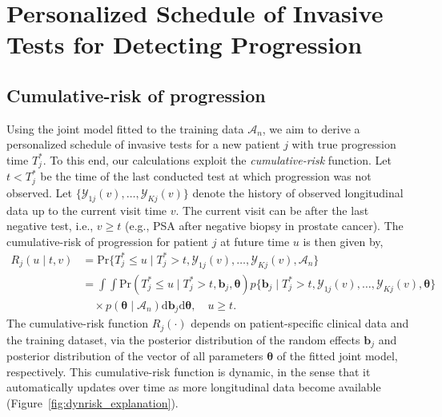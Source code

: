 \section{Personalized Schedule of Invasive Tests for Detecting Progression} 
\label{sec:schedule}

\subsection{Cumulative-risk of progression} 
\label{subsec:cum_risk}
Using the joint model fitted to the training data $\mathcal{A}_n$, we aim to derive a personalized schedule of invasive tests for a new patient $j$ with true progression time $T^*_j$. To this end, our calculations exploit the \emph{cumulative-risk} function. Let $t<T^*_j$ be the time of the last conducted test at which progression was not observed. Let $\{\mathcal{Y}_{1j}(v), \ldots, \mathcal{Y}_{Kj}(v)\}$ denote the history of observed longitudinal data up to the current visit time $v$. The current visit can be after the last negative test, i.e., $v \geq t$ (e.g., PSA after negative biopsy in prostate cancer). The cumulative-risk of progression for patient $j$ at future time $u$ is then given by,
\begin{equation}
\label{eq:cumulative_risk}
\begin{split}
R_j(u \mid t, v) &= \mbox{Pr}\big\{T^*_j \leq u \mid T^*_j > t, \mathcal{Y}_{1j}(v), \ldots, \mathcal{Y}_{Kj}(v), \mathcal{A}_n\big\}\\
&=\int \int \mbox{Pr}(T^*_j \leq u \mid T^*_j > t, \boldsymbol{b}_{j}, \boldsymbol{\theta}) p\big\{\boldsymbol{b}_j \mid T^*_j > t, \mathcal{Y}_{1j}(v), \ldots, \mathcal{Y}_{Kj}(v), \boldsymbol{\theta} \big\}\\
&\quad \times p(\boldsymbol{\theta} \mid \mathcal{A}_n) \mathrm{d}\boldsymbol{b}_j \mathrm{d}\boldsymbol{\theta}, \quad u \geq t.
\end{split}
\end{equation}
The cumulative-risk function $R_j(\cdot)$ depends on patient-specific clinical data and the training dataset, via the posterior distribution of the random effects $\boldsymbol{b}_{j}$ and posterior distribution of the vector of all parameters $\boldsymbol{\theta}$ of the fitted joint model, respectively. This cumulative-risk function is dynamic, in the sense that it automatically updates over time as more longitudinal data become available (Figure~\ref{fig:dynrisk_explanation}).
